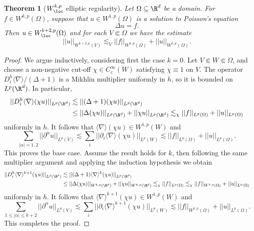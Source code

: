 \documentclass[reqno]{amsart}
\newtheorem{theorem}{Theorem}
\theoremstyle{definition}
\theoremstyle{remark}
\begin{document}
\begin{theorem}[$W^{k, p}_{\loc}$ elliptic regularity]
	Let $\Omega \subseteq \R^d$ be a domain. For $f \in W^{k, p} (\Omega)$, suppose that $u \in W^{1, p} (\Omega)$ is a solution to Poisson's equation
		\[ \Delta u  = f. \]
	Then $u \in W^{k + 2, p}_{\loc} (\Omega)$ and for each $V \Subset \Omega$ we have the estimate	
		\[ || u||_{W^{k + 2, p} (V)} \lesssim_V ||f||_{W^{k, p} (\Omega)} + ||u||_{W^{k, p}(\Omega)}. \]
\end{theorem}

\begin{proof}
	We argue inductively, considering first the case $k = 0$. Let $V \Subset W \Subset \Omega$, and choose a non-negative cut-off $\chi \in C^\infty_c (W)$ satisfying $\chi \equiv 1$ on $V$. The operator $D^h_i \langle \nabla \rangle/(\Delta + 1)$ is a Mikhlin multiplier uniformly in $h$, so it is bounded on $L^p (\R^d)$. In particular, 
		\begin{align*}
			 ||D^h_i \langle \nabla \rangle (\chi u)||_{L^p (\R^d)} 
			 	&\lesssim || (\Delta + 1) (\chi u)||_{L^p (\R^d)} \\
			 	&\leq ||\Delta (\chi u)||_{L^p (\R^d)} + ||\chi u||_{L^p (\R^d)}  \lesssim_\chi ||f||_{L^p (\Omega)} + ||u||_{L^p (\Omega)}
		\end{align*}
	uniformly in $h$. It follows that $\langle \nabla \rangle (\chi u) \in W^{1, p} (W)$ and
		\[  \sum_{|\alpha| = 1, 2} ||\partial^\alpha u||_{L^p (V)} \lesssim \sum_i ||\partial_i \langle \nabla \rangle  (\chi u)||_{L^p (W)} \lesssim ||f||_{L^p (\Omega)} + ||u||_{L^p (\Omega)}. \]
	This proves the base case. Assume the result holds for $k$, then following the same multiplier argument and applying the induction hypothesis we obtain
	\begin{align*}
			 ||D^h_i \langle \nabla \rangle^{k + 1} (\chi u)||_{L^p (\R^d)} 
			 	&\lesssim || (\Delta + 1) \langle \nabla \rangle^k (\chi u)||_{L^p (\R^d)} \\
			 	&\leq ||\Delta (\chi u)||_{W^{k, p} (\R^d)} + ||\chi u||_{W^{k, p}(\R^d)}  \lesssim_\chi ||f||_{L^p (\Omega)} \lesssim_\chi ||f||_{W^{k, p} (\Omega)} + ||u||_{L^p (\Omega)}
		\end{align*}	 
	uniformly in $h$. It follows that $\langle \nabla \rangle^{k + 1} (\chi u) \in W^{1, p} (W)$ and 
		\[ \sum_{1 \leq |\alpha| \leq k + 2} ||\partial^\alpha u||_{L^p (V)} \lesssim \sum_i ||\partial_i \langle \nabla \rangle^{k + 1} (\chi u)||_{L^p (W)} \lesssim || f||_{W^{k, p} (\Omega)} + ||u||_{L^p (\Omega)}. \]	
	This completes the proof. 		
\end{proof}
\end{document}
